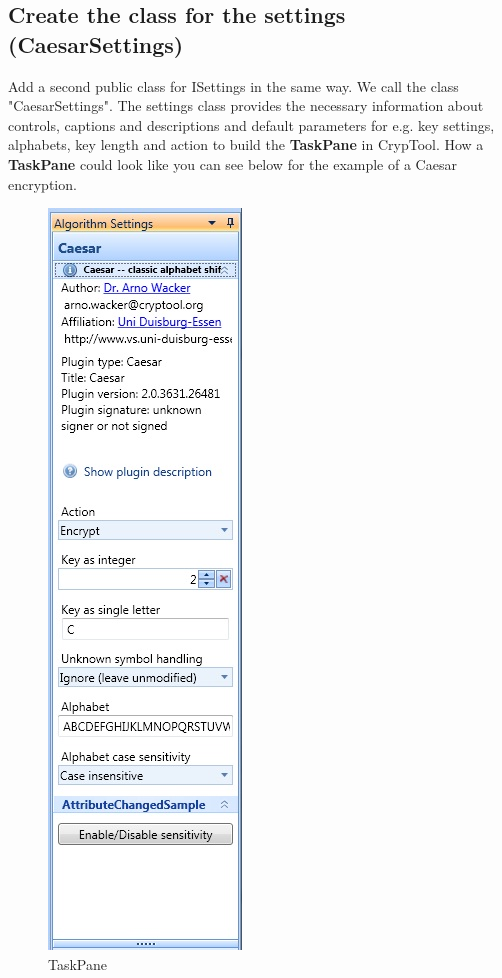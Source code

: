 \subsection{Create the class for the settings (CaesarSettings)}\label{sec:CreateTheClassForTheSettingsCaesarSettings}
Add a second public class for ISettings in the same way. We call the class "CaesarSettings". The settings class provides the necessary information about controls, captions and descriptions and default parameters for e.g. key settings, alphabets, key length and action to build the \textbf{TaskPane} in CrypTool.\clearpage
How a \textbf{TaskPane} could look like you can see below for the example of a Caesar encryption.\\
\begin{figure}[h!]
	\centering
		\includegraphics{figures/task_pane.jpg}
	\caption{TaskPane}
	\label{fig:task_pane}
\end{figure}\\
